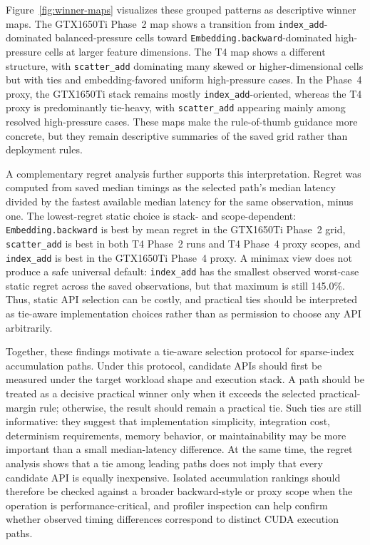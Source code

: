 Figure~\ref{fig:winner-maps} visualizes these grouped patterns as descriptive winner maps. The GTX1650Ti Phase~2 map shows a transition from \texttt{index\_add}-dominated balanced-pressure cells toward \texttt{Embedding.backward}-dominated high-pressure cells at larger feature dimensions. The T4 map shows a different structure, with \texttt{scatter\_add} dominating many skewed or higher-dimensional cells but with ties and embedding-favored uniform high-pressure cases. In the Phase~4 proxy, the GTX1650Ti stack remains mostly \texttt{index\_add}-oriented, whereas the T4 proxy is predominantly tie-heavy, with \texttt{scatter\_add} appearing mainly among resolved high-pressure cases. These maps make the rule-of-thumb guidance more concrete, but they remain descriptive summaries of the saved grid rather than deployment rules.

A complementary regret analysis further supports this interpretation. Regret was computed from saved median timings as the selected path's median latency divided by the fastest available median latency for the same observation, minus one. The lowest-regret static choice is stack- and scope-dependent: \texttt{Embedding.backward} is best by mean regret in the GTX1650Ti Phase~2 grid, \texttt{scatter\_add} is best in both T4 Phase~2 runs and T4 Phase~4 proxy scopes, and \texttt{index\_add} is best in the GTX1650Ti Phase~4 proxy. A minimax view does not produce a safe universal default: \texttt{index\_add} has the smallest observed worst-case static regret across the saved observations, but that maximum is still 145.0\%. Thus, static API selection can be costly, and practical ties should be interpreted as tie-aware implementation choices rather than as permission to choose any API arbitrarily.

Together, these findings motivate a tie-aware selection protocol for sparse-index accumulation paths. Under this protocol, candidate APIs should first be measured under the target workload shape and execution stack. A path should be treated as a decisive practical winner only when it exceeds the selected practical-margin rule; otherwise, the result should remain a practical tie. Such ties are still informative: they suggest that implementation simplicity, integration cost, determinism requirements, memory behavior, or maintainability may be more important than a small median-latency difference. At the same time, the regret analysis shows that a tie among leading paths does not imply that every candidate API is equally inexpensive. Isolated accumulation rankings should therefore be checked against a broader backward-style or proxy scope when the operation is performance-critical, and profiler inspection can help confirm whether observed timing differences correspond to distinct CUDA execution paths.

